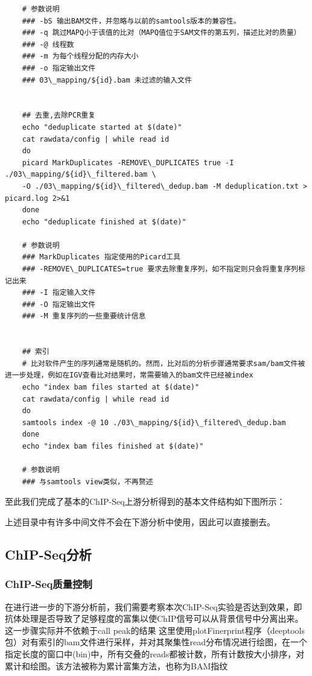 \begin{lstlisting}
    # 参数说明
    ### -bS 输出BAM文件，并忽略与以前的samtools版本的兼容性。
    ### -q 跳过MAPQ小于该值的比对（MAPQ值位于SAM文件的第五列，描述比对的质量）
    ### -@ 线程数
    ### -m 为每个线程分配的内存大小
    ### -o 指定输出文件
    ### 03\_mapping/${id}.bam 未过滤的输入文件


    ## 去重,去除PCR重复
    echo "deduplicate started at $(date)"
    cat rawdata/config | while read id
    do
    picard MarkDuplicates -REMOVE\_DUPLICATES true -I ./03\_mapping/${id}\_filtered.bam \
    -O ./03\_mapping/${id}\_filtered\_dedup.bam -M deduplication.txt > picard.log 2>&1
    done
    echo "deduplicate finished at $(date)"

    # 参数说明
    ### MarkDuplicates 指定使用的Picard工具
    ### -REMOVE\_DUPLICATES=true 要求去除重复序列，如不指定则只会将重复序列标记出来
    ### -I 指定输入文件
    ### -O 指定输出文件
    ### -M 重复序列的一些重要统计信息


    ## 索引
    # 比对软件产生的序列通常是随机的。然而，比对后的分析步骤通常要求sam/bam文件被进一步处理，例如在IGV查看比对结果时，常需要输入的bam文件已经被index
    echo "index bam files started at $(date)"
    cat rawdata/config | while read id
    do
    samtools index -@ 10 ./03\_mapping/${id}\_filtered\_dedup.bam
    done
    echo "index bam files finished at $(date)"
    
    # 参数说明
    ### 与samtools view类似，不再赘述
\end{lstlisting}


至此我们完成了基本的ChIP-Seq上游分析得到的基本文件结构如下图所示：\par

上述目录中有许多中间文件不会在下游分析中使用，因此可以直接删去。



\subsection{ChIP-Seq分析}

\subsubsection{ChIP-Seq质量控制}
在进行进一步的下游分析前，我们需要考察本次ChIP-Seq实验是否达到效果，即抗体处理是否导致了足够程度的富集以使ChIP信号可以从背景信号中分离出来。这一步骤实际并不依赖于call peak的结果
这里使用plotFinerprint程序（deeptools包）对有索引的bam文件进行采样，并对其聚集性read分布情况进行绘图，在一个指定长度的窗口中(bin)中，所有交叠的reads都被计数，所有计数按大小排序，对累计和绘图。该方法被称为累计富集方法，也称为BAM指纹


